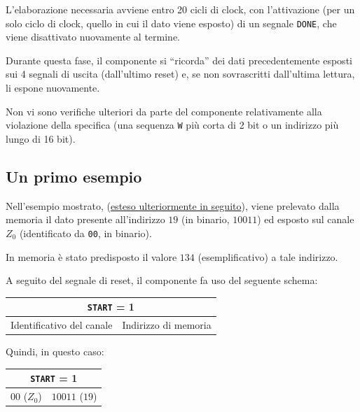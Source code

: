 \documentclass[a4paper,11pt]{article} %
\begin{document}
    L'elaborazione necessaria avviene entro 20 cicli di clock, con l'attivazione (per un solo ciclo di clock, quello in cui il dato viene esposto) di un segnale \texttt{DONE}, che
    viene disattivato nuovamente al termine.

    Durante questa fase, il componente si “ricorda” dei dati precedentemente esposti sui 4 segnali di uscita (dall'ultimo reset) e, se non sovrascritti dall'ultima lettura, li espone nuovamente.

    Non vi sono verifiche ulteriori da parte del componente relativamente alla violazione della specifica (una sequenza \texttt{W} più corta di 2 bit
    o un indirizzo più lungo di 16 bit).

    \subsection{Un primo esempio}\label{subsec:un-primo-esempio}

    Nell'esempio mostrato, (\hyperref[subsubsec:test-bench-n.-1]{esteso ulteriormente in seguito}), viene prelevato dalla memoria il dato presente all'indirizzo $19$
    (in binario, $10011$) ed esposto sul canale $Z_0$ (identificato da \texttt{00}, in binario).

    In memoria è stato predisposto il valore $134$ (esemplificativo) a tale indirizzo.

    A seguito del segnale di reset, il componente fa uso del seguente schema:

    \medskip

    \begin{tabular}{|c|c|}
        \hline
        \multicolumn{2}{|c|}{\texttt{START} = 1} \\
        \hline
        Identificativo del canale & Indirizzo di memoria \\
        \hline
    \end{tabular}

    \medskip

    Quindi, in questo caso:

    \medskip

    \begin{tabular}{|c|c|}
        \hline
        \multicolumn{2}{|c|}{\texttt{START} = 1} \\
        \hline
        $00$ ($Z_0$) & $10011$ ($19$) \\
        \hline
    \end{tabular}

    \medskip
\end{document}
